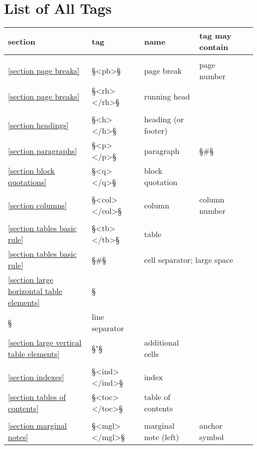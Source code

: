  

\newpage
\appendix


\section{List of All Tags}
\label{appendix list of all tags}

\newcommand{\eins}{{\fontspec{DejaVu Sans}{①}}}
\newcommand{\zwei}{{\fontspec{DejaVu Sans}{②}}}

\begin{longtable}[l]{@{}llll@{}l@{}}
section & tag & name & tag may contain \\[1mm]
\hline \\
\ref{section page breaks} & §<pb>§ & page break & page number & \eins \\
\ref{section page breaks} & §<rh> </rh>§ & running head && \eins \\
\\
\ref{section headings} & §<h> </h>§ & heading (or footer) && \eins \\
\ref{section paragraphs} & §<p> </p>§ & paragraph & §#§ & \eins \\
\ref{section block quotations} & §<q> </q>§ & block quotation && \eins \\
\\
\ref{section columns} & §<col> </col>§ & column & column number & \eins \\
\\
\ref{section tables basic rule} & §<tb> </tb>§ & table && \eins \\
\ref{section tables basic rule} & §#§ & \multicolumn{2}{l}{cell separator; large space} \\
\ref{section large horizontal table elements} & §\\§ & line separator && \\
\ref{section large vertical table elements} & §"§ & additional cells && \\
\\
\ref{section indexes} & §<ind> </ind>§ & index && \eins \\
\ref{section tables of contents} & §<toc> </toc>§ & table of contents && \eins \\
\\
\ref{section marginal notes} & §<mgl> </mgl>§ & marginal note (left) & anchor symbol & \eins \\

\end{longtable}

